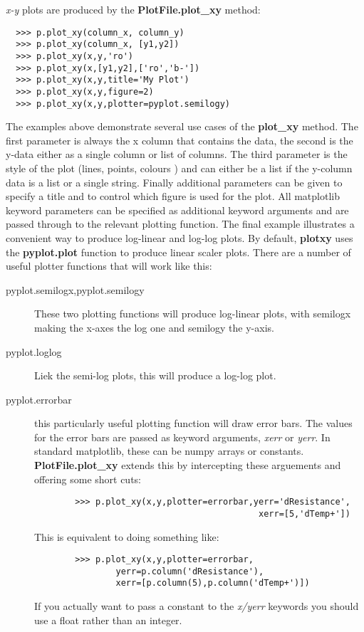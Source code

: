 \documentclass[a4paper,11pt]{scrartcl}
\begin{document}
\textit{x-y} plots are produced by the \textbf{PlotFile.plot\_xy} method:

\begin{verbatim}
  >>> p.plot_xy(column_x, column_y)
  >>> p.plot_xy(column_x, [y1,y2])
  >>> p.plot_xy(x,y,'ro')
  >>> p.plot_xy(x,[y1,y2],['ro','b-'])
  >>> p.plot_xy(x,y,title='My Plot')
  >>> p.plot_xy(x,y,figure=2)
  >>> p.plot_xy(x,y,plotter=pyplot.semilogy)
\end{verbatim}

The examples above demonstrate several use cases of the \textbf{plot\_xy} method. The first parameter is always the x column that contains the data, the second is the y-data either as a single column or list of columns. The third parameter is the style of the plot (lines, points, colours \etc) and can either be a list if the y-column data is a list or a single string. Finally additional parameters can be given to specify a title and to control which figure is used for the plot. All matplotlib keyword parameters can be specified as additional keyword arguments and are passed through to the relevant plotting function. The final example illustrates a convenient way to produce log-linear and log-log plots. By default, \textbf{plotxy} uses the \textbf{pyplot.plot} function to produce linear scaler plots. There are a number of useful plotter functions that will work like this:
\begin{description}
  \item[pyplot.semilogx,pyplot.semilogy] These two plotting functions will produce log-linear plots, with semilogx making the x-axes the log one and semilogy the y-axis.
  \item[pyplot.loglog] Liek the semi-log plots, this will produce a log-log plot.
  \item[pyplot.errorbar] this particularly useful plotting function will draw error bars. The values for the error bars are passed as keyword arguments, \textit{xerr} or \textit{yerr}. In standard matplotlib, these can be numpy arrays or constants. \textbf{PlotFile.plot\_xy} extends this by intercepting these arguements and offering some short cuts:
      \begin{verbatim}
        >>> p.plot_xy(x,y,plotter=errorbar,yerr='dResistance',
                                            xerr=[5,'dTemp+'])
      \end{verbatim}
      This is equivalent to doing something like:
       \begin{verbatim}
        >>> p.plot_xy(x,y,plotter=errorbar,
                yerr=p.column('dResistance'),
                xerr=[p.column(5),p.column('dTemp+')])
      \end{verbatim}
    If you actually want to pass a constant to the \textit{x/yerr} keywords you should use a float rather than an integer.
\end{description}
\end{document}
